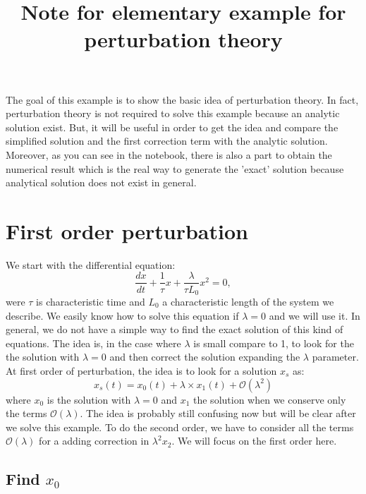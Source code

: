 \documentclass[a4paper,10pt]{article}
\title{Note for elementary example for perturbation theory}
\begin{document}
\maketitle

The goal of this example is to show the basic idea of perturbation theory. In fact, perturbation theory is not required to solve this example because an analytic solution exist. But, it will be useful in order to get the idea and compare the simplified solution and the first correction term with the analytic solution. Moreover, as you can see in the notebook, there is also a part to obtain the numerical result which is the real way to generate the 'exact' solution because analytical solution does not exist in general.

\section{First order perturbation}

We start with the differential equation:
\begin{equation}
\label{eq:start}
\frac{dx}{dt} + \frac{1}{\tau}x + \frac{\lambda}{\tau L_0}x^2 = 0,
\end{equation}
were $\tau$ is characteristic time and $L_0$ a characteristic length of the system we describe. We easily know how to solve this equation if $\lambda=0$ and we will use it. In general, we do not have a simple way to find the exact solution of this kind of equations. The idea is, in the case where $\lambda$ is small compare to 1, to look for the the solution with $\lambda=0$ and then correct the solution expanding  the $\lambda$ parameter. At first order of perturbation, the idea is to look for a solution $x_s$ as:
\begin{equation}
\label{eq:form_pt}
x_s(t) = x_0(t) + \lambda\times x_1(t) + \mathcal{O}(\lambda^2)
\end{equation}
where $x_0$ is the solution with $\lambda=0$ and $x_1$ the solution when we conserve only the terms $\mathcal{O}(\lambda)$. The idea is probably still confusing now but will be clear after we solve this example. To do the second order, we have to consider all the terms $\mathcal{O}(\lambda)$ for a adding correction in $\lambda^2 x_2$. We will focus on the first order here.

\subsection{Find $x_0$}
\end{document}
